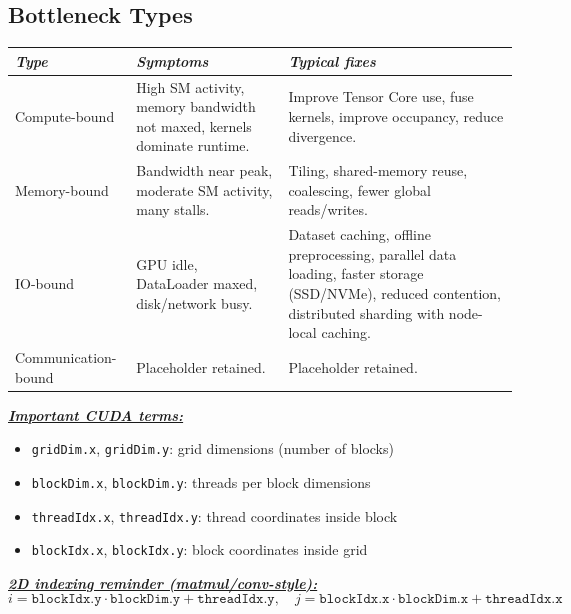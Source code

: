 \documentclass[12pt]{article}
\newcommand{\keysent}[1]{\textbf{\textit{\uline{#1}}}}
\let\origtextbf\textbf
\renewcommand{\textbf}[1]{\origtextbf{\textit{#1}}}
\begin{document}
\subsection{Bottleneck Types}
{\footnotesize
\setlength{\tabcolsep}{2.8pt}
\begin{tabularx}{0.98\textwidth}{|>{\raggedright\arraybackslash}p{2.2cm}|X|X|}
\hline
\textbf{Type} & \textbf{Symptoms} & \textbf{Typical fixes} \\
\hline
Compute-bound & High SM activity, memory bandwidth not maxed, kernels dominate runtime. & Improve Tensor Core use, fuse kernels, improve occupancy, reduce divergence. \\
\hline
Memory-bound & Bandwidth near peak, moderate SM activity, many stalls. & Tiling, shared-memory reuse, coalescing, fewer global reads/writes. \\
\hline
IO-bound & GPU idle, DataLoader maxed, disk/network busy. & Dataset caching, offline preprocessing, parallel data loading, faster storage (SSD/NVMe), reduced contention, distributed sharding with node-local caching. \\
\hline
Communication-bound & Placeholder retained. & Placeholder retained. \\
\hline
\end{tabularx}
}

\keysent{Important CUDA terms:}
\begin{itemize}
\item \texttt{gridDim.x}, \texttt{gridDim.y}: grid dimensions (number of blocks)
\item \texttt{blockDim.x}, \texttt{blockDim.y}: threads per block dimensions
\item \texttt{threadIdx.x}, \texttt{threadIdx.y}: thread coordinates inside block
\item \texttt{blockIdx.x}, \texttt{blockIdx.y}: block coordinates inside grid
\end{itemize}

\keysent{2D indexing reminder (matmul/conv-style):}
\[
i = \texttt{blockIdx.y} \cdot \texttt{blockDim.y} + \texttt{threadIdx.y}, \quad
j = \texttt{blockIdx.x} \cdot \texttt{blockDim.x} + \texttt{threadIdx.x}
\]
\end{document}
